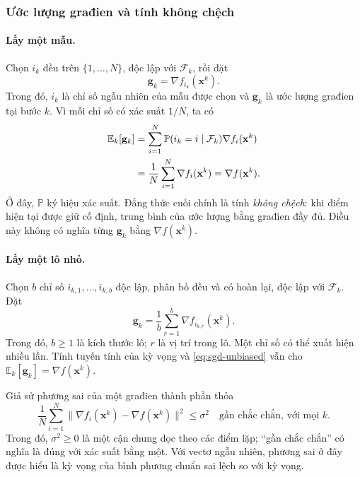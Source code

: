 \subsubsection{Ước lượng građien và tính không chệch}
\paragraph{Lấy một mẫu.}
Chọn $i_k$ đều trên $\{1,\ldots,N\}$, độc lập với $\mathcal{F}_k$, rồi đặt
\begin{equation}
 \mathbf{g}_k=\nabla f_{i_k}(\mathbf{x}^{k}).
 \label{eq:sgd-single}
\end{equation}
Trong đó, $i_k$ là chỉ số ngẫu nhiên của mẫu được chọn và $\mathbf{g}_k$
là ước lượng građien tại bước $k$. Vì mỗi chỉ số có xác suất $1/N$, ta có
\begin{align}
 \mathbb{E}_k[\mathbf{g}_k]
 &=\sum_{i=1}^{N}\mathbb{P}(i_k=i\mid\mathcal{F}_k)
                 \nabla f_i(\mathbf{x}^{k})\notag\\
 &=\frac{1}{N}\sum_{i=1}^{N}\nabla f_i(\mathbf{x}^{k})
 =\nabla f(\mathbf{x}^{k}).
 \label{eq:sgd-unbiased}
\end{align}
Ở đây, $\mathbb{P}$ ký hiệu xác suất. Đẳng thức cuối chính là tính
\emph{không chệch}: khi điểm hiện tại được giữ cố định, trung bình của
ước lượng bằng građien đầy đủ. Điều này không có nghĩa từng
$\mathbf{g}_k$ bằng $\nabla f(\mathbf{x}^{k})$.

\paragraph{Lấy một lô nhỏ.}
Chọn $b$ chỉ số $i_{k,1},\ldots,i_{k,b}$ độc lập, phân bố đều và có hoàn lại,
độc lập với $\mathcal{F}_k$. Đặt
\begin{equation}
 \mathbf{g}_k=\frac{1}{b}\sum_{r=1}^{b}
                   \nabla f_{i_{k,r}}(\mathbf{x}^{k}).
 \label{eq:sgd-batch}
\end{equation}
Trong đó, $b\geq1$ là kích thước lô; $r$ là vị trí trong lô. Một chỉ số
có thể xuất hiện nhiều lần. Tính tuyến tính của kỳ vọng và
\eqref{eq:sgd-unbiased} vẫn cho $\mathbb{E}_k[\mathbf{g}_k]=\nabla f(\mathbf{x}^{k})$.

Giả sử phương sai của một građien thành phần thỏa
\begin{equation}
 \frac{1}{N}\sum_{i=1}^{N}
 \|\nabla f_i(\mathbf{x}^{k})-\nabla f(\mathbf{x}^{k})\|^2
 \leq\sigma^2
 \quad\text{gần chắc chắn, với mọi }k.
 \label{eq:sgd-sample-variance}
\end{equation}
Trong đó, $\sigma^2\geq0$ là một cận chung dọc theo các điểm lặp;
``gần chắc chắn'' có nghĩa là đúng với xác suất bằng một.
Với vectơ ngẫu nhiên, phương sai ở đây được hiểu là kỳ vọng của bình
phương chuẩn sai lệch so với kỳ vọng.


